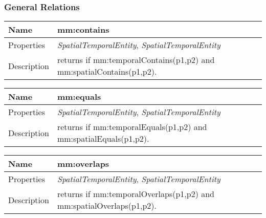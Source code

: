 \subsubsection*{General Relations}
\begin{tabular}{|p{3cm}|p{10cm}|}
\hline Name & mm:contains\\
\hline Properties & \textit{SpatialTemporalEntity}, \textit{SpatialTemporalEntity} \\
\hline Description & returns if mm:temporalContains(p1,p2) and mm:spatialContains(p1,p2).\\
\hline
\end{tabular}
\vspace{0.3cm}
\newline
\begin{tabular}{|p{3cm}|p{10cm}|}
\hline Name & mm:equals\\
\hline Properties & \textit{SpatialTemporalEntity}, \textit{SpatialTemporalEntity} \\
\hline Description & returns if mm:temporalEquals(p1,p2) and mm:spatialEquals(p1,p2).\\
\hline
\end{tabular}
\vspace{0.3cm}
\newline
\begin{tabular}{|p{3cm}|p{10cm}|}
\hline Name & mm:overlaps\\
\hline Properties & \textit{SpatialTemporalEntity}, \textit{SpatialTemporalEntity} \\
\hline Description & returns if mm:temporalOverlaps(p1,p2) and mm:spatialOverlaps(p1,p2).\\
\hline
\end{tabular}
\vspace{0.3cm}
\newline
